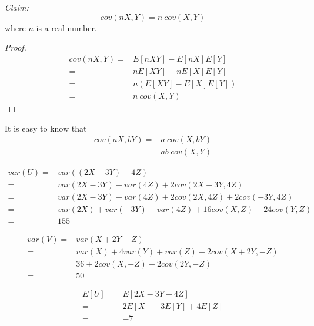 \documentclass{article}
\begin{document}
        \textit{Claim:}
            $$cov(nX,Y)=n\ cov(X,Y)$$
           where $n$ is a real number.
        \begin{proof}
            \begin{equation*}
                \begin{split}
                    cov(nX,Y)=&E[nXY]-E[nX]E[Y]\\
                        =&nE[XY]-nE[X]E[Y]\\
                        =&n(E[XY]-E[X]E[Y])\\
                        =&n\ cov(X,Y)
                \end{split}
            \end{equation*}
        \end{proof}
        It is easy to know that
        \begin{equation*}
            \begin{split}
                cov(aX,bY)=&a\ cov(X,bY)\\
                    =&ab\ cov(X,Y)
            \end{split}
        \end{equation*}

        \begin{equation*}
            \begin{split}
                var(U)=&var((2X-3Y)+4Z)\\
                    =&var(2X-3Y)+var(4Z)+2cov(2X-3Y,4Z)\\
                    =&var(2X-3Y)+var(4Z)+2cov(2X,4Z)+2cov(-3Y,4Z)\\
                    =&var(2X)+var(-3Y)+var(4Z)+16cov(X,Z)-24cov(Y,Z)\\
                    =&155
            \end{split}
        \end{equation*}

        \begin{equation*}
            \begin{split}
                var(V)=&var(X+2Y-Z)\\
                    =&var(X)+4var(Y)+var(Z)+2cov(X+2Y,-Z)\\
                    =&36+2cov(X,-Z)+2cov(2Y,-Z)\\
                    =&50
            \end{split}
        \end{equation*}

        \begin{equation*}
            \begin{split}
                E[U]=&E[2X-3Y+4Z]\\
                    =&2E[X]-3E[Y]+4E[Z]\\
                    =&-7
            \end{split}
        \end{equation*}
\end{document}
